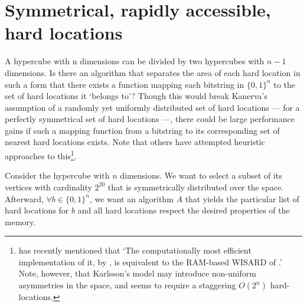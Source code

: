 




\section{Symmetrical, rapidly accessible, hard locations}

A hypercube with n dimensions can be divided by two hypercubes with $n-1$ dimensions. Is there an algorithm that separates the area of each hard location in such a form that there exists a function mapping each bitstring in $\{0,1\}^n$ to the set of hard locations it `belongs to'?  Though this would break Kanerva's assumption of a randomly yet uniformly distributed set of hard locations --- for a perfectly symmetrical set of hard locations ---, there could be large performance gains if such a mapping function from a bitstring to its corresponding set of nearest hard locations exists. Note that others have attempted heuristic approaches to this\footnote{\citet{Kanerva2009} has recently mentioned that `The computationally most efficient implementation of it, by \citet{Karlsson95afast}, is equivalent to the RAM-based WISARD of  \citet{aleksander1982computer}.' Note, however, that Karlsson's model may introduce non-uniform asymmetries in the space, and seems to require a staggering $O(2^n)$ hard-locations.}.

Consider the hypercube with $n$ dimensions.  We want to select a subset of its vertices with cardinality $2^{20}$ that is symmetrically distributed over the space. Afterward, $\forall b \in \{ 0,1\} ^n$, we want an algorithm $A$ that yields the particular list of hard locations for $b$ and all hard locations respect the desired properties of the memory.

